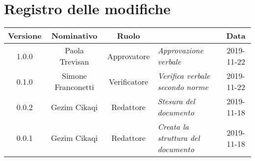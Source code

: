 \section*{Registro delle modifiche}
\renewcommand{\arraystretch}{1.8}
  
  \begin{longtable}{|c|c|c|p{3.8cm}|c|}
    \hline
    
    \rowcolor{header}
    \textbf{Versione} & \textbf{Nominativo} & \textbf{Ruolo} & \centering{\textbf{Descrizione}} & \textbf{Data}\\
    
    \hline
    
    1.0.0 & Paola Trevisan & Approvatore & \small{\textit{Approvazione verbale}} & 2019-11-22\\
    0.1.0 & Simone Franconetti & Verificatore & \small{\textit{Verifica verbale secondo norme}} & 2019-11-22\\
    0.0.2 & Gezim Cikaqi & Redattore & \small{\textit{Stesura del documento}} & 2019-11-18\\
    0.0.1 & Gezim Cikaqi & Redattore & \small{\textit{Creata la struttura del documento}} & 2019-11-18\\
    
    \hline
  \end{longtable}